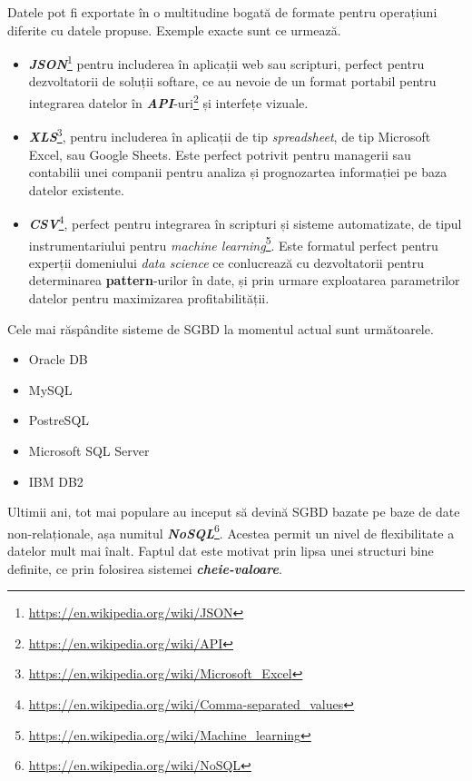 \documentclass[12pt. a4paper]{report}
\begin{document}
Datele pot fi exportate în o multitudine bogată de formate pentru operațiuni diferite cu datele propuse. Exemple exacte sunt ce urmează.
\begin{itemize}
	\item  \emph{\textbf{JSON}}\footnote{\url{https://en.wikipedia.org/wiki/JSON}} pentru includerea în aplicații web sau scripturi, perfect pentru dezvoltatorii de soluții softare, ce au nevoie de un format portabil pentru integrarea datelor în \emph{\textbf{API}}-uri\footnote{\url{https://en.wikipedia.org/wiki/API}} și interfețe vizuale. 
	
	\item \emph{\textbf{XLS}}\footnote{\url{https://en.wikipedia.org/wiki/Microsoft_Excel}}, pentru includerea în aplicații de tip \emph{spreadsheet}, de tip Microsoft Excel, sau Google Sheets. 
	Este perfect potrivit pentru managerii sau contabilii unei companii pentru analiza și prognozartea informației pe baza datelor existente.
	
	\item \emph{\textbf{CSV}}\footnote{\url{https://en.wikipedia.org/wiki/Comma-separated_values}}, perfect pentru integrarea în scripturi și sisteme automatizate, de tipul instrumentariului pentru \emph{machine learning}\footnote{\url{https://en.wikipedia.org/wiki/Machine_learning}}. Este formatul perfect pentru experții domeniului \emph{data science} ce conlucrează cu dezvoltatorii pentru determinarea \textbf{pattern}-urilor în date, și prin urmare exploatarea parametrilor datelor pentru maximizarea profitabilității.
\end{itemize}

Cele mai răspândite sisteme de SGBD la momentul actual sunt următoarele.
\begin{itemize}
	\item Oracle DB
	\item MySQL
	\item PostreSQL
	\item Microsoft SQL Server
	\item IBM DB2
\end{itemize}

Ultimii ani, tot mai populare au inceput să devină SGBD bazate pe baze de date non-relaționale, așa numitul \emph{\textbf{NoSQL}}\footnote{\url{https://en.wikipedia.org/wiki/NoSQL}}. Acestea permit un nivel de flexibilitate a datelor mult mai înalt. Faptul dat este motivat prin lipsa unei structuri bine definite, ce prin folosirea sistemei \emph{\textbf{cheie-valoare}}.
\end{document}
